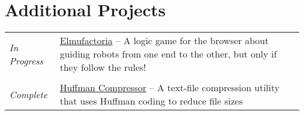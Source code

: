 \documentclass[a4paper,12pt]{article}
\begin{document}
\section{Additional Projects}
\begin{tabularx}{\textwidth}{@{}p{6em}|X@{}}
    \emph{In Progress} & \href{https://github.com/mintchkin/elmufactoria}{Elmufactoria} -- A logic game for the browser about guiding robots from one end to the other, but only if they follow the rules! \\

    \multicolumn{2}{c}{}                                                                                                                                                                                   \\

    \emph{Complete}    & \href{https://github.com/mintchkin/Huffman-Compressor}{Huffman Compressor} -- A text-file compression utility that uses Huffman coding to reduce file sizes                       \\
\end{tabularx}
\end{document}
